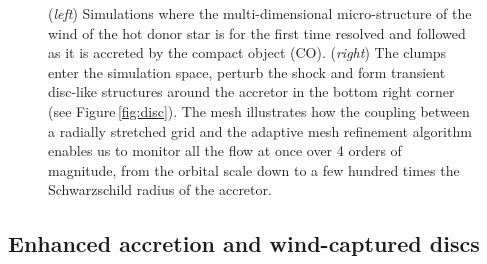 \documentclass[letterpaper,12pt,onecolumn]{article}
\makeatletter
\newcommand*{\hmxb}{HMXB\@\xspace}
\makeatother
\begin{document}
\begin{figure}[!t]
\begin{subfigure}{0.45\columnwidth}
\end{subfigure}
\caption{(\textit{left}) Simulations where the multi-dimensional micro-structure of the wind of the hot donor star is for the first time resolved and followed as it is accreted by the compact object (CO). (\textit{right}) The clumps enter the simulation space, perturb the shock and form transient disc-like structures around the accretor in the bottom right corner (see Figure\,\ref{fig:disc}). The mesh illustrates how the coupling between a radially stretched grid and the adaptive mesh refinement algorithm enables us to monitor all the flow at once over 4 orders of magnitude, from the orbital scale down to a few hundred times the Schwarzschild radius of the accretor.}
\label{fig:config_SgXB_and_mesh}
\end{figure}

\renewcommand{\headrulewidth}{1pt}
\pagestyle{fancy}
\fancyhf{}
\rfoot{\thepage / \pageref{LastPage}}

\subsection*{Enhanced accretion and wind-captured discs}


\normalsize

\end{document}
